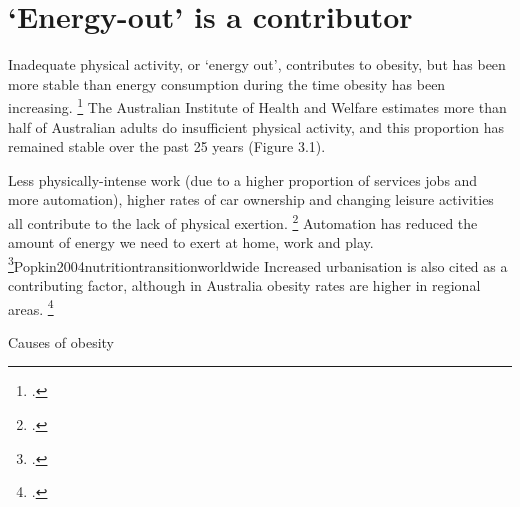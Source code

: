 \documentclass[embargoed]{grattan}
\begin{document}
\section{`Energy-out' is a contributor }\label{energy-out-is-a-contributor}

Inadequate physical activity, or `energy out', contributes to obesity, but has been more stable than energy consumption during the time obesity has been increasing.%
\footcites{Keith2006Putativecontributorssecular}{Popkin2004nutritiontransitionworldwide}{Stubbs2004obesityepidemicboth} The Australian Institute of Health and Welfare estimates more than half of Australian adults do insufficient physical activity, and this proportion has remained stable over the past 25 years (Figure 3.1).

Less physically-intense work (due to a higher proportion of services jobs and more automation), higher rates of car ownership and changing leisure activities all contribute to the lack of physical exertion. \footcites{Popkin2004nutritiontransitionworldwide}{Finkelstein2010EconomicsObesity}{Popkin1998obesityepidemicis}{Drewnowski1997nutritiontransitionnew} Automation has reduced the amount of energy we need to exert at home, work and play.%
\footcite{Caballero2007globalepidemicobesity}{Popkin2004nutritiontransitionworldwide} Increased urbanisation is also cited as a contributing factor, although in Australia obesity rates are higher in regional areas.%
\footcites{Popkin1998obesityepidemicis}{Drewnowski1997nutritiontransitionnew}

\begin{table}
\caption{Causes of obesity}




\end{table}
\end{document}
